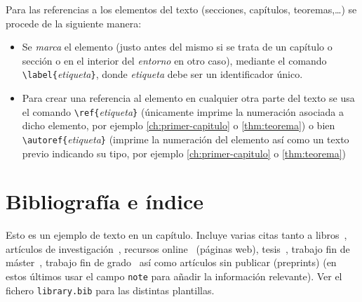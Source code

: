 Para las referencias a los elementos del texto (secciones, capítulos, teoremas,\ldots) se procede de la siguiente manera:
\begin{itemize}
  \item Se \emph{marca} el elemento (justo antes del mismo si se trata de un capítulo o sección o en el interior del \emph{entorno} en otro caso), mediante el comando \verb+\label{+\emph{etiqueta}\verb+}+, donde \emph{etiqueta} debe ser un identificador único.
  \item Para crear una referencia al elemento en cualquier otra parte del texto se usa el comando \verb+\ref{+\emph{etiqueta}\verb+}+ (únicamente imprime la numeración asociada a dicho elemento, por ejemplo \ref{ch:primer-capitulo} o \ref{thm:teorema}) o bien \verb+\autoref{+\emph{etiqueta}\verb+}+ (imprime la numeración del elemento así como un texto previo indicando su tipo, por ejemplo \autoref{ch:primer-capitulo} o \autoref{thm:teorema})
\end{itemize}




\section{Bibliografía e índice}

Esto es un ejemplo de texto en un capítulo. Incluye varias citas tanto a libros~\cite{Aigner2018}, artículos de investigación~\cite{Euler1985}, recursos online~\cite{EulerWiki} (páginas web), tesis~\cite{CitekeyPhdthesis}, trabajo fin de máster~\cite{CitekeyMastersthesis}, trabajo fin de grado~\cite{CiteKeyBachelorsthesis} así como artículos sin publicar (preprints) \cite{castroinfantes2022conjugate} (en estos últimos usar el campo \texttt{note} para añadir la información relevante). Ver el fichero \texttt{library.bib} para las distintas plantillas. 

\endinput
